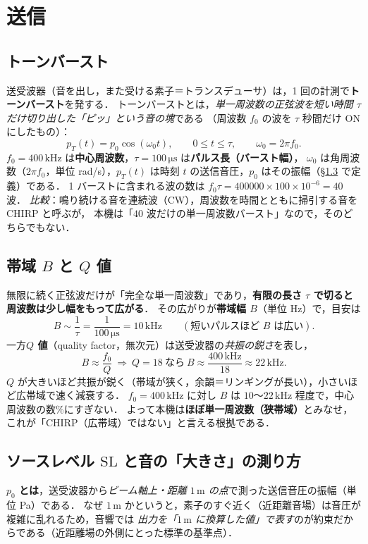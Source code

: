 \documentclass[11pt]{ltjsarticle}
\newcommand{\unit}[1]{\,\mathrm{#1}}
\begin{document}
\section{送信}

\subsection{トーンバースト}
送受波器（音を出し，また受ける素子＝トランスデューサ）は，1 回の計測で\textbf{トーンバースト}を発する．
トーンバーストとは，\emph{単一周波数の正弦波を短い時間 $\tau$ だけ切り出した「ピッ」という音の塊}である
（周波数 $f_0$ の波を $\tau$ 秒間だけ ON にしたもの）：
\begin{equation}
p_T(t)=p_0\cos(\omega_0 t),\qquad 0\le t\le \tau,\qquad \omega_0=2\pi f_0 .
\end{equation}
$f_0=400\unit{kHz}$ は\textbf{中心周波数}，$\tau=100\unit{\mu s}$ は\textbf{パルス長（バースト幅）}，
$\omega_0$ は角周波数（$2\pi f_0$，単位 rad/s），$p_T(t)$ は時刻 $t$ の送信音圧，$p_0$ はその振幅（\S\ref{ssec:SL} で定義）である．
1 バーストに含まれる波の数は $f_0\tau=400000\times100\times10^{-6}=40$ 波．
\emph{比較}：鳴り続ける音を連続波（CW），周波数を時間とともに掃引する音を CHIRP と呼ぶが，
本機は「$40$ 波だけの単一周波数バースト」なので，そのどちらでもない．

\subsection{帯域 $B$ と $Q$ 値}
無限に続く正弦波だけが「完全な単一周波数」であり，\textbf{有限の長さ $\tau$ で切ると周波数は少し幅をもって広がる}．
その広がりが\textbf{帯域幅 $B$}（単位 Hz）で，目安は
\begin{equation}
B\sim\frac{1}{\tau}=\frac{1}{100\unit{\mu s}}=10\unit{kHz}\qquad(\text{短いパルスほど }B\text{ は広い}).
\end{equation}
一方\textbf{$Q$ 値}（quality factor，無次元）は送受波器の\emph{共振の鋭さ}を表し，
\begin{equation}
B\approx\frac{f_0}{Q}\ \Rightarrow\ Q=18\ \text{なら}\ B\approx\frac{400\unit{kHz}}{18}\approx22\unit{kHz}.
\end{equation}
$Q$ が大きいほど共振が鋭く（帯域が狭く，余韻＝リンギングが長い），小さいほど広帯域で速く減衰する．
$f_0=400\unit{kHz}$ に対し $B$ は $10$〜$22\unit{kHz}$ 程度で，中心周波数の数\%にすぎない．
よって本機は\textbf{ほぼ単一周波数（狭帯域）}とみなせ，これが「CHIRP（広帯域）ではない」と言える根拠である．

\subsection{ソースレベル $\mathrm{SL}$ と音の「大きさ」の測り方}
\label{ssec:SL}
\textbf{$p_0$ とは}，送受波器から\emph{ビーム軸上・距離 $1\unit{m}$ の点}で測った送信音圧の振幅（単位 Pa）である．
なぜ $1\unit{m}$ かというと，素子のすぐ近く（近距離音場）は音圧が複雑に乱れるため，音響では
\emph{出力を「$1\unit{m}$ に換算した値」で表す}のが約束だからである（近距離場の外側にとった標準の基準点）．
\end{document}

